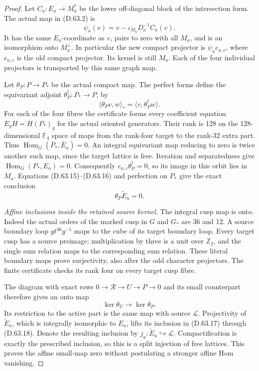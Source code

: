 \begin{proof}
Let \(C_a:E_a\to M_a^*\) be the lower off-diagonal
block of the intersection form. The actual map in
(D.63.2) is
\[
       \psi_a(v)=v-\iota_{M_a}D_a^{-1}C_a(v).
 \tag{D.63.15}
\]
It has the same \(E_a\)-coordinate as \(v\), pairs
to zero with all \(M_a\), and is an isomorphism
onto \(M_a^\perp\). In particular the new compact
projector is \(\psi_a e_{a,c}\), where \(e_{a,c}\)
is the old compact projector. Its kernel is still
\(M_a\). Each of the four individual projectors
is transported by this same graph map.

Let \(\theta_P:P\to P_*\) be the actual compact
map. The perfect forms define the equivariant
adjoint \(\theta_P^\dagger:P_*\to P\), by
\[
       \langle\theta_Pv,w\rangle_*
                  =\langle v,\theta_P^\dagger w\rangle.
 \tag{D.63.16}
\]
For each of the four fibres the certificate forms
every coefficient equation
\(E_gH=H(P_*)_g\) for the actual oriented generators.
Their rank is 128 on the 128-dimensional
\(\mathbb F_4\) space of maps from the rank-four
target to the rank-32 extra part. Thus
\(\operatorname{Hom}_G(\bar P_*,\bar E_a)=0\).
An integral equivariant map reducing to zero is
twice another such map, since the target lattice
is free. Iteration and separatedness give
\(\operatorname{Hom}_G(P_*,E_a)=0\).
Consequently \(e_{a,c}\theta_P^\dagger=0\), so its
image in this orbit lies in \(M_a\). Equations
(D.63.15)--(D.63.16) and perfection on \(P_*\)
give the exact conclusion
\[
                         \theta_P\widetilde E_a=0.
 \tag{D.63.17}
\]

\emph{Affine inclusions inside the retained source kernel.}
The integral cusp map is onto. Indeed the actual
orders of the marked cusp in \(G\) and \(G_*\)
are 36 and 12. A source boundary loop
\(g t^{36}g^{-1}\) maps to the cube of its target
boundary loop. Every target cusp has a source
preimage; multiplication by three is a unit over
\(\mathbb Z_2\), and the single sum relation maps
to the corresponding sum relation. These literal
boundary maps prove surjectivity, also after the
odd character projectors. The finite certificate
checks its rank four on every target cusp fibre.

The diagram with exact rows
\(0\to\mathcal R\to U\to P\to0\) and its small
counterpart therefore gives an onto map
\[
 \ker\theta_U\longrightarrow\ker\theta_P.
 \tag{D.63.18}
\]
Its restriction to the active part is the same
map with source \(\mathcal L\). Projectivity of
\(\widetilde E_a\), which is integrally isomorphic
to \(E_a\), lifts its inclusion in (D.63.17)
through (D.63.18). Denote the resulting inclusion
by \(j_a:\widetilde E_a\hookrightarrow\mathcal L\).
Compactification is exactly the prescribed inclusion,
so this is a split injection of free lattices.
This proves the affine small-map zero without
postulating a stronger affine Hom vanishing.


\end{proof}

